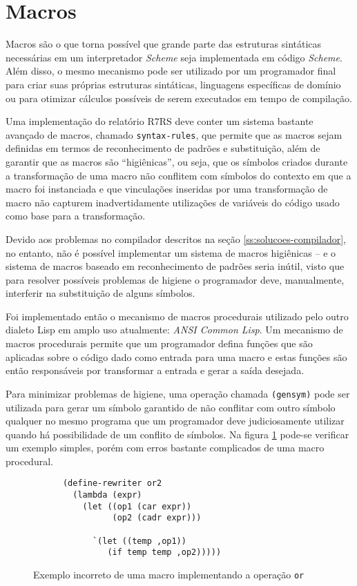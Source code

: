 \section{Macros}
\label{sec:macros}

Macros são o que torna possível que grande parte das estruturas sintáticas 
necessárias em um interpretador \textit{Scheme} seja implementada em código
\textit{Scheme}. Além disso, o mesmo mecanismo pode ser utilizado por um 
programador final para criar suas próprias estruturas sintáticas, linguagens
específicas de domínio ou para otimizar cálculos possíveis de serem executados
em tempo de compilação.

Uma implementação do relatório \acs{R7RS} deve conter um sistema bastante
avançado de macros, chamado \texttt{syntax-rules}, que permite que as macros
sejam definidas em termos de reconhecimento de padrões e substituição, além de
garantir que as macros são ``higiênicas'', ou seja, que os símbolos criados
durante a transformação de uma macro não conflitem com símbolos do contexto em
que a macro foi instanciada e que vinculações inseridas por uma transformação 
de macro não capturem inadvertidamente utilizações de variáveis do código
usado como base para a transformação.

Devido aos problemas no compilador descritos na seção
\ref{ss:solucoes-compilador}, no entanto, não é possível implementar um sistema
de macros higiênicas -- e o sistema de macros baseado em reconhecimento de
padrões seria inútil, visto que para resolver possíveis problemas de higiene o
programador deve, manualmente, interferir na substituição de alguns símbolos. 

Foi implementado então o mecanismo de macros procedurais utilizado pelo outro
dialeto Lisp em amplo uso atualmente: \textit{ANSI Common Lisp}. Um mecanismo
de macros procedurais permite que um programador defina funções que são
aplicadas sobre o código dado como entrada para uma macro e estas funções são
então responsáveis por transformar a entrada e gerar a saída desejada.

Para minimizar problemas de higiene, uma operação chamada \texttt{(gensym)}
pode ser utilizada para gerar um símbolo garantido de não conflitar com outro
símbolo qualquer no mesmo programa que um programador deve judiciosamente
utilizar quando há possibilidade de um conflito de símbolos. Na figura 
\ref{fig:exemplo-defmacro1} pode-se verificar um exemplo simples, porém com
erros bastante complicados de uma macro procedural.

\begin{figure}[h!]
\begin{lstlisting}
      (define-rewriter or2
        (lambda (expr)
          (let ((op1 (car expr))
                (op2 (cadr expr)))
          
		    `(let ((temp ,op1))
		       (if temp temp ,op2)))))
\end{lstlisting}
\caption{Exemplo incorreto de uma macro implementando a operação \texttt{or}}
\label{fig:exemplo-defmacro1}
\end{figure}


